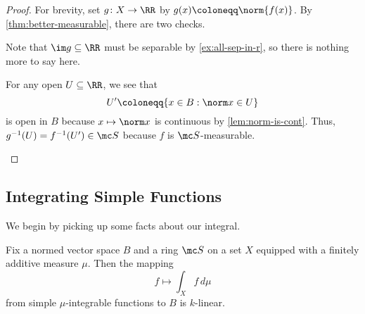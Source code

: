 \documentclass[../notes.tex]{subfiles}
\begin{document}
\begin{proof}
	For brevity, set $g\colon X\to\RR$ by $g(x)\coloneqq\norm{f(x)}$. By \autoref{thm:better-measurable}, there are two checks.
	\begin{listroman}
		\item Note that $\im g\subseteq\RR$ must be separable by \autoref{ex:all-sep-in-r}, so there is nothing more to say here.
		\item For any open $U\subseteq\RR$, we see that
		\[U'\coloneqq\{x\in B:\norm x\in U\}\]
		is open in $B$ because $x\mapsto\norm x$ is continuous by \autoref{lem:norm-is-cont}. Thus, $g^{-1}(U)=f^{-1}(U')\in\mc S$ because $f$ is $\mc S$-measurable.
		\qedhere
	\end{listroman}
\end{proof}

\subsection{Integrating Simple Functions}
We begin by picking up some facts about our integral.
\begin{lemma} \label{lem:int-is-linear}
	Fix a normed vector space $B$ and a ring $\mc S$ on a set $X$ equipped with a finitely additive measure $\mu$. Then the mapping
	\[f\mapsto\int_Xf\,d\mu\]
	from simple $\mu$-integrable functions to $B$ is $k$-linear.
\end{lemma}
\end{document}
